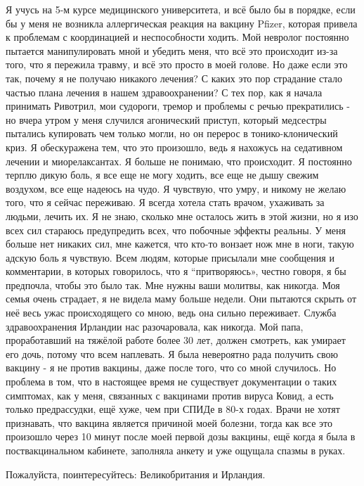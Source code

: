Я учусь на 5-м курсе медицинского университета, и всё было бы в порядке, если бы
у меня не возникла аллергическая реакция на вакцину Pfizer, которая привела к
проблемам с координацией и неспособности ходить. Мой невролог постоянно пытается
манипулировать мной и убедить меня, что всё это происходит из-за того, что я
пережила травму, и всё это просто в моей голове. Но даже если это так, почему я
не получаю никакого лечения? С каких это пор страдание стало частью плана
лечения в нашем здравоохранении? С тех пор, как я начала принимать Ривотрил, мои
судороги, тремор и проблемы с речью прекратились - но вчера утром у меня
случился агонический приступ, который медсестры пытались купировать чем только
могли, но он перерос в тонико-клонический криз. Я обескуражена тем, что это
произошло, ведь я нахожусь на седативном лечении и миорелаксантах. Я больше не
понимаю, что происходит. Я постоянно терплю дикую боль, я все еще не могу
ходить, все еще не дышу свежим воздухом, все еще надеюсь на чудо. Я чувствую,
что умру, и никому не желаю того, что я сейчас переживаю. Я всегда хотела стать
врачом, ухаживать за людьми, лечить их. Я не знаю, сколько мне осталось жить в
этой жизни, но я изо всех сил стараюсь предупредить всех, что побочные эффекты
реальны. У меня больше нет никаких сил, мне кажется, что кто-то вонзает нож мне
в ноги, такую адскую боль я чувствую. Всем людям, которые присылали мне
сообщения и комментарии, в которых говорилось, что я “притворяюсь», честно
говоря, я бы предпочла, чтобы это было так. Мне нужны ваши молитвы, как
никогда. Моя семья очень страдает, я не видела маму больше недели. Они пытаются
скрыть от неё весь ужас происходящего со мною, ведь она сильно
переживает. Служба здравоохранения Ирландии нас разочаровала, как никогда. Мой
папа, проработавший на тяжёлой работе более 30 лет, должен смотреть, как умирает
его дочь, потому что всем наплевать. Я была невероятно рада получить свою
вакцину - я не против вакцины, даже после того, что со мной случилось. Но
проблема в том, что в настоящее время не существует документации о таких
симптомах, как у меня, связанных с вакцинами против вируса Ковид, а есть только
предрассудки, ещё хуже, чем при СПИДе в 80-х годах. Врачи не хотят признавать,
что вакцина является причиной моей болезни, тогда как все это произошло через 10
минут после моей первой дозы вакцины, ещё когда я была в поствакцинальном
кабинете, заполняла анкету и уже ощущала спазмы в руках.

Пожалуйста, поинтересуйтесь: Великобритания и Ирландия.

